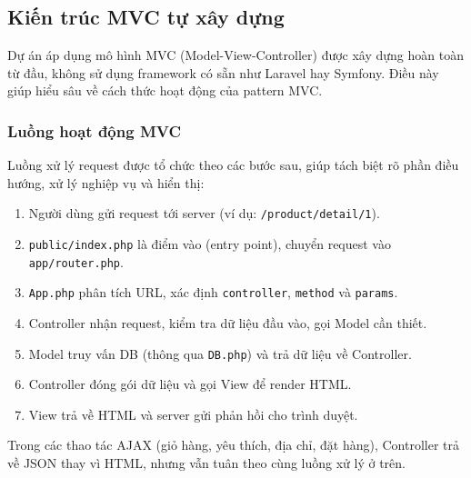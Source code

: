 \subsection{Kiến trúc MVC tự xây dựng}

Dự án áp dụng mô hình MVC (Model-View-Controller) được xây dựng hoàn toàn từ đầu, không sử dụng framework có sẵn như Laravel hay Symfony. Điều này giúp hiểu sâu về cách thức hoạt động của pattern MVC.

\subsubsection{Luồng hoạt động MVC}

Luồng xử lý request được tổ chức theo các bước sau, giúp tách biệt rõ phần điều hướng, xử lý nghiệp vụ và hiển thị:
\begin{enumerate}
    \item Người dùng gửi request tới server (ví dụ: \texttt{/product/detail/1}).
    \item \texttt{public/index.php} là điểm vào (entry point), chuyển request vào \texttt{app/router.php}.
    \item \texttt{App.php} phân tích URL, xác định \texttt{controller}, \texttt{method} và \texttt{params}.
    \item Controller nhận request, kiểm tra dữ liệu đầu vào, gọi Model cần thiết.
    \item Model truy vấn DB (thông qua \texttt{DB.php}) và trả dữ liệu về Controller.
    \item Controller đóng gói dữ liệu và gọi View để render HTML.
    \item View trả về HTML và server gửi phản hồi cho trình duyệt.
\end{enumerate}

Trong các thao tác AJAX (giỏ hàng, yêu thích, địa chỉ, đặt hàng), Controller trả về JSON thay vì HTML, nhưng vẫn tuân theo cùng luồng xử lý ở trên.

